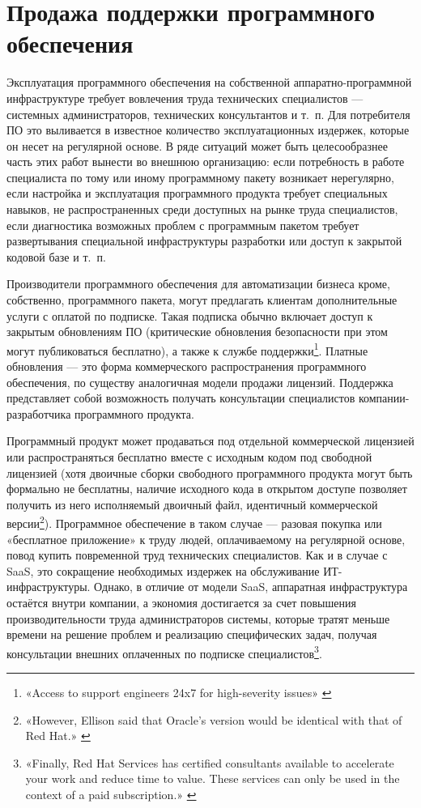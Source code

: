 \documentclass{article}
\begin{document}
\section*{Продажа поддержки программного обеспечения}

Эксплуатация программного обеспечения на собственной аппаратно-программной инфраструктуре требует вовлечения труда технических специалистов — системных администраторов, технических консультантов и т.~п. Для потребителя ПО это выливается в известное количество эксплуатационных издержек, которые он несет на регулярной основе. В ряде ситуаций может быть целесообразнее часть этих работ вынести во внешнюю организацию: если потребность в работе специалиста по тому или иному программному пакету возникает нерегулярно, если настройка и эксплуатация программного продукта требует специальных навыков, не распространенных среди доступных на рынке труда специалистов, если диагностика возможных проблем с программным пакетом требует развертывания специальной инфраструктуры разработки или доступ к закрытой кодовой базе и т.~п.

Производители программного обеспечения для автоматизации бизнеса кроме, собственно, программного пакета, могут предлагать клиентам дополнительные услуги с оплатой по подписке. Такая подписка обычно включает доступ к закрытым обновлениям ПО (критические обновления безопасности при этом могут публиковаться бесплатно), а также к службе поддержки\footnote{«Access to support engineers 24x7 for high-severity issues» \cite{redhatSubscriptionModel}}. Платные обновления — это форма коммерческого распространения программного обеспечения, по существу аналогичная модели продажи лицензий. Поддержка представляет собой возможность получать консультации специалистов компании-разработчика программного продукта.

Программный продукт может продаваться под отдельной коммерческой лицензией или распространяться бесплатно вместе с исходным кодом под свободной лицензией (хотя двоичные сборки свободного программного продукта могут быть формально не бесплатны, наличие исходного кода в открытом доступе позволяет получить из него исполняемый двоичный файл, идентичный коммерческой версии\footnote{«However, Ellison said that Oracle’s version would be identical with that of Red Hat.» \cite{oracleMovesToRedhat}}). Программное обеспечение в таком случае — разовая покупка или «бесплатное приложение» к труду людей, оплачиваемому на регулярной основе, повод купить повременной труд технических специалистов. Как и в случае с SaaS, это сокращение необходимых издержек на обслуживание ИТ-инфраструктуры. Однако, в отличие от модели SaaS, аппаратная инфраструктура остаётся внутри компании, а экономия достигается за счет повышения производительности труда администраторов системы, которые тратят меньше времени на решение проблем и реализацию специфических задач, получая консультации внешних оплаченных по подписке специалистов\footnote{«Finally, Red Hat Services has certified consultants available to accelerate your work and reduce time to value. These services can only be used in the context of a paid subscription.» \cite{redhatSubscriptionGuide}}.
\end{document}
